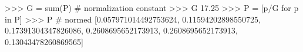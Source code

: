 
>>> G = sum(P) # normalization constant
>>> G
17.25
>>> P = [p/G for p in P]
>>> P # normed
[0.057971014492753624, 0.11594202898550725, 0.17391304347826086,
0.2608695652173913, 0.2608695652173913, 0.13043478260869565]

